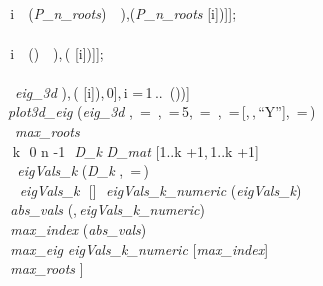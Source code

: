 \documentclass{article}
\begin{document}
{\\
     \coloneqq []\colon 
\\
  \coloneqq []\colon 
\\
  \coloneqq []\colon 
\\
 \,i \,\, (\textit{P\_n\_roots})\, \, \coloneqq [\mathit{op} (\mathit{points}),\,[\Re (\textit{P\_n\_roots} [i]),\Im (\textit{P\_n\_roots} [i])]];
\\
 \,\colon 
\\
 \,i \,\, ()\, \, \coloneqq [\mathit{op} (\mathit{eig}),\,[\Re (\mathit{eigVals} [i]),\,\Im ( [i])]];
\\
 \,\colon 
\\
  \, \textit{eig\_3d} \coloneqq [\mathit{seq} ([\Re (\mathit{eigVals} [i]),\,\Im ( [i]),\,0],\,i =\,1\,..\, ())]\colon 
\\
 \textit{plot3d\_eig} \coloneqq {} (\textit{eig\_3d} ,\, =\, ,\, =\,5,\, =\, ,\, =\,[,\,,\,``Y''],\, =\,)\colon 
\\
 \, \textit{max\_roots} \coloneqq []\colon 
\\
 \,\,k \,\,0\,\,n -1\, \,\textit{D\_k} \coloneqq \textit{D\_mat} [1..k +1,\,1..k +1]\colon 
\\
 \, \,\textit{eigVals\_k} \coloneqq {} (\textit{D\_k} ,\, =\,)\colon 
\\
 \, \,\,\textit{eigVals\_k} \,\neq \,[]\, \,\textit{eigVals\_k\_numeric} \coloneqq {} (\textit{eigVals\_k})\colon 
\\
 \,\textit{abs\_vals} \coloneqq {} (,\,\textit{eigVals\_k\_numeric})\colon 
\\
 \,\textit{max\_index} \coloneqq {}(\textit{abs\_vals})\colon 
\\
 \,\textit{max\_eig} \coloneqq \textit{eigVals\_k\_numeric} [\textit{max\_index}]\colon 
\\
 \,\textit{max\_roots} \coloneqq [\mathit{op} (\textit{max\_roots}),\,[\Re (\textit{max\_eig}),\,\Im (\textit{max\_eig})]]\colon 
}
\end{document}
